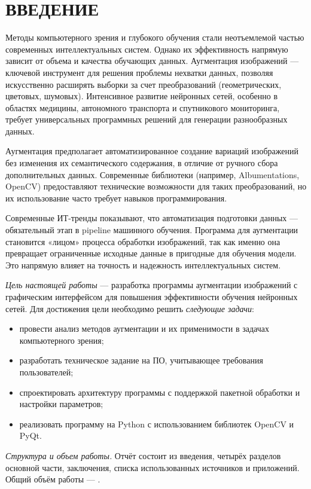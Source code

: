 \section*{ВВЕДЕНИЕ}

Методы компьютерного зрения и глубокого обучения стали неотъемлемой частью современных интеллектуальных систем. Однако их эффективность напрямую зависит от объема и качества обучающих данных. Аугментация изображений — ключевой инструмент для решения проблемы нехватки данных, позволяя искусственно расширять выборки за счет преобразований (геометрических, цветовых, шумовых). Интенсивное развитие нейронных сетей, особенно в областях медицины, автономного транспорта и спутникового мониторинга, требует универсальных программных решений для генерации разнообразных данных.

Аугментация предполагает автоматизированное создание вариаций изображений без изменения их семантического содержания, в отличие от ручного сбора дополнительных данных. Современные библиотеки (например, Albumentations, OpenCV) предоставляют технические возможности для таких преобразований, но их использование часто требует навыков программирования.

Современные ИТ-тренды показывают, что автоматизация подготовки данных — обязательный этап в pipeline машинного обучения. Программа для аугментации становится «лицом» процесса обработки изображений, так как именно она превращает ограниченные исходные данные в пригодные для обучения модели. Это напрямую влияет на точность и надежность интеллектуальных систем.

\emph{Цель настоящей работы} — разработка программы аугментации изображений с графическим интерфейсом для повышения эффективности обучения нейронных сетей. Для достижения цели необходимо решить \emph{следующие задачи}:
\begin{itemize}
	\item провести анализ методов аугментации и их применимости в задачах компьютерного зрения;
	\item разработать техническое задание на ПО, учитывающее требования пользователей;
	\item спроектировать архитектуру программы с поддержкой пакетной обработки и настройки параметров;
	\item реализовать программу на Python с использованием библиотек OpenCV и PyQt.
\end{itemize}

\emph{Структура и объем работы.} Отчёт состоит из введения, четырёх разделов основной части, заключения, списка использованных источников и приложений. Общий объём работы — .

